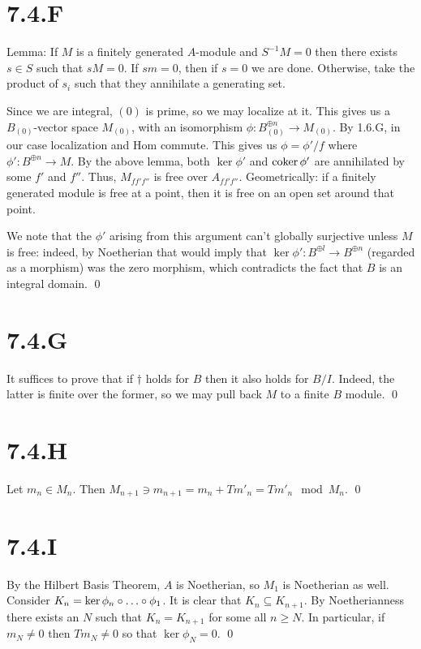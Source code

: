 \documentclass{article}
\begin{document}
\section{7.4.F}
Lemma: If $M$ is a finitely generated
$A$-module and $S^{-1}M=0$ then there exists
$s \in S$ such that $sM=0$. If
$sm=0$, then if $s=0$ we are done.
Otherwise, take the product of $s_i$ such that they
annihilate a generating set.

Since we are integral, $(0)$ is prime, so we may localize at
it. This gives us a $B_{(0)}$-vector space
$M_{(0)}$, with an isomorphism $\phi: B_{(0)}^{\oplus n} \to M_{(0)}$. By 1.6.G,
in our case localization and Hom commute. This gives us $\phi=\phi'/f$
where $\phi': B^{\oplus n} \to M$. By the above lemma, both $\ker \phi'$
and $\operatorname{coker} \phi'$ are annihilated by some $f'$ and
$f''$. Thus, $M_{ff'f''}$ is free over
$A_{ff'f''}$. Geometrically: if a finitely generated module is free
at a point, then it is free on an open set around that point.

We note that the $\phi'$ arising from this argument can't
globally surjective unless $M$ is free: indeed, by
Noetherian that would imply that $\ker \phi': B^{\oplus l} \to B^{\oplus n}$ (regarded as a
morphism) was the zero morphism, which contradicts the fact that
$B$ is an integral domain. \qed

\section{7.4.G}
It suffices to prove that if $\dagger$ holds for
$B$ then it also holds for $B/I$. Indeed,
the latter is finite over the former, so we may pull back
$M$ to a finite $B$ module. \qed

\section{7.4.H}
Let $m_n \in M_n$. Then $M_{n+1} \ni
    m_{n+1}=m_n+Tm'_n=Tm'_n \mod M_n$. \qed

\section{7.4.I}
By the Hilbert Basis Theorem, $A$ is Noetherian, so
$M_1$ is Noetherian as well. Consider
$K_n=\ker \phi_n\after \dots \after \phi_1$. It is clear that $K_n \subseteq K_{n+1}$. By
Noetherianness there exists an $N$ such that
$K_n=K_{n+1}$ for some all $n \geq N$. In particular, if
$m_N \neq 0$ then $Tm_N \neq 0$ so that
$\ker \phi_N = 0$. \qed
\end{document}
